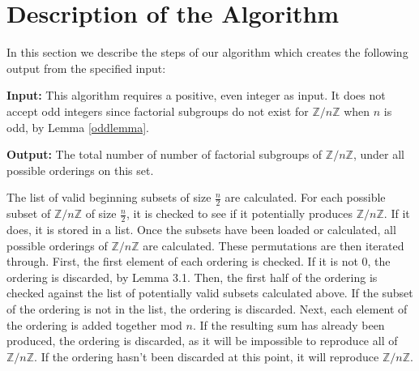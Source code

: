 \documentclass{article}
\newcommand{\ZZ}{\mathbb{Z}}
\newcommand{\ZnZ}{\ZZ/n\ZZ}
\begin{document}
\section{Description of the Algorithm}

In this section we describe the steps of our algorithm which creates the following output from the specified input:

\noindent\textbf{Input:} This algorithm requires a positive, even integer as input. It does not accept odd integers since factorial subgroups do not exist for $\ZnZ$ when $n$ is odd, by Lemma \ref{oddlemma}.

\noindent\textbf{Output:} The total number of number of factorial subgroups of $\ZnZ$, under all possible orderings on this set.

The list of valid beginning subsets of size $\frac{n}{2}$ are calculated. For each possible subset of $\ZnZ$ of size $\frac{n}{2}$, it is checked to see if it potentially produces $\ZnZ$. If it does, it is stored in a list. Once the subsets have been loaded or calculated, all possible orderings of $\ZnZ$ are calculated. These permutations are then iterated through. First, the first element of each ordering is checked. If it is not 0, the ordering is discarded, by Lemma 3.1. Then, the first half of the ordering is checked against the list of potentially valid subsets calculated above. If the subset of the ordering is not in the list, the ordering is discarded. Next, each element of the ordering is added together mod $n$. If the resulting sum has already been produced, the ordering is discarded, as it will be impossible to reproduce all of $\ZnZ$. If the ordering hasn't been discarded at this point, it will reproduce $\ZnZ$.
\end{document}
